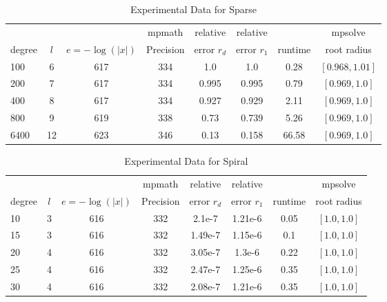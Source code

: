 \documentclass[sigconf]{acmart}
\begin{document}
\begin{table}[t]
\caption{Experimental Data for Sparse}
\label{tab:sparse}
\vskip -0.15in
\begin{center}
\begin{small}
\begin{sc}
\begin{tabular}{lccccccc}
\toprule
&  &  & mpmath & relative  & relative &  & mpsolve \\
degree  & $l$& $e=-\log(|x|)$& Precision &error $r_d$       & error $r_1$ &runtime& root radius\\
\midrule
 100 & 6 & 617 & 334 & 1.0 & 1.0 & 0.28 & $[0.968, 1.01]$\\
 200 & 7 & 617 & 334 & 0.995 & 0.995 & 0.79 & $[0.969, 1.0]$\\
 400 & 8 & 617 & 334 & 0.927 & 0.929 & 2.11 & $[0.969, 1.0]$\\
 800 & 9 & 619 & 338 & 0.73 & 0.739 & 5.26 & $[0.969, 1.0]$\\
 6400 & 12 & 623 & 346 & 0.13 & 0.158 & 66.58 & $[0.969, 1.0]$\\
\bottomrule
\end{tabular}
\end{sc}
\end{small}
\end{center}
\vskip 0.05in
\end{table}

\begin{table}[t]
\caption{Experimental Data for Spiral}
\label{tab:spiral}
\vskip -0.15in
\begin{center}
\begin{small}
\begin{sc}
\begin{tabular}{lccccccc}
\toprule
&  &  & mpmath & relative  & relative &  & mpsolve \\
degree  & $l$& $e=-\log(|x|)$& Precision &error $r_d$       & error $r_1$ &runtime& root radius\\
\midrule
 10 & 3 & 616 & 332 & 2.1e-7 & 1.21e-6 & 0.05 & $[1.0, 1.0]$\\
 15 & 3 & 616 & 332 & 1.49e-7 & 1.15e-6 & 0.1 & $[1.0, 1.0]$\\
 20 & 4 & 616 & 332 & 3.05e-7 & 1.3e-6 & 0.22 & $[1.0, 1.0]$\\
 25 & 4 & 616 & 332 & 2.47e-7 & 1.25e-6 & 0.35 & $[1.0, 1.0]$\\
 30 & 4 & 616 & 332 & 2.08e-7 & 1.21e-6 & 0.35 & $[1.0, 1.0]$\\
\bottomrule
\end{tabular}
\end{sc}
\end{small}
\end{center}
\vskip 0.05in
\end{table}
\end{document}

